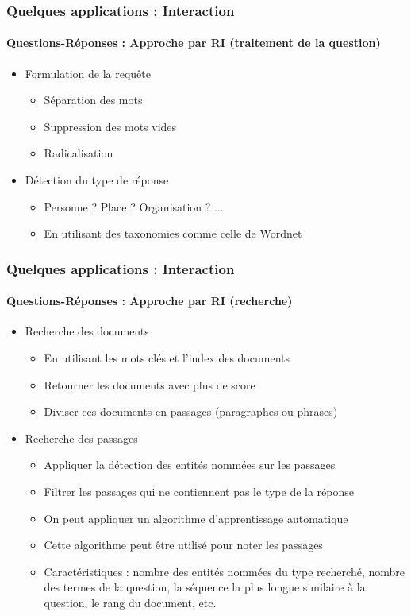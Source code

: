 \documentclass[xcolor=table]{beamer}
\begin{document}
\begin{frame}
	\frametitle{Quelques applications : Interaction}
	\framesubtitle{Questions-Réponses : Approche par RI (traitement de la question)}
	
	\begin{itemize}
		\item Formulation de la requête
		\begin{itemize}
			\item Séparation des mots
			\item Suppression des mots vides
			\item Radicalisation  
		\end{itemize}
	    \item Détection du type de réponse
	    \begin{itemize}
	    	\item Personne ? Place ? Organisation ? ...
	    	\item En utilisant des taxonomies comme celle de Wordnet  
	    \end{itemize}
	\end{itemize}
	
\end{frame}

\begin{frame}
	\frametitle{Quelques applications : Interaction}
	\framesubtitle{Questions-Réponses : Approche par RI (recherche)}
	
	\begin{itemize}
		\item Recherche des documents
		\begin{itemize}
			\item En utilisant les mots clés et l'index des documents
			\item Retourner les documents avec plus de score
			\item Diviser ces documents en passages (paragraphes ou phrases)
		\end{itemize}
		\item Recherche des passages
		\begin{itemize}
			\item Appliquer la détection des entités nommées sur les passages
			\item Filtrer les passages qui ne contiennent pas le type de la réponse
			\item On peut appliquer un algorithme d'apprentissage automatique
			\item Cette algorithme peut être utilisé pour noter les passages
			\item Caractéristiques : nombre des entités nommées du type recherché, nombre des termes de la question, la séquence la plus longue similaire à la question, le rang du document, etc.
		\end{itemize}
	\end{itemize}
	
\end{frame}
\end{document}
